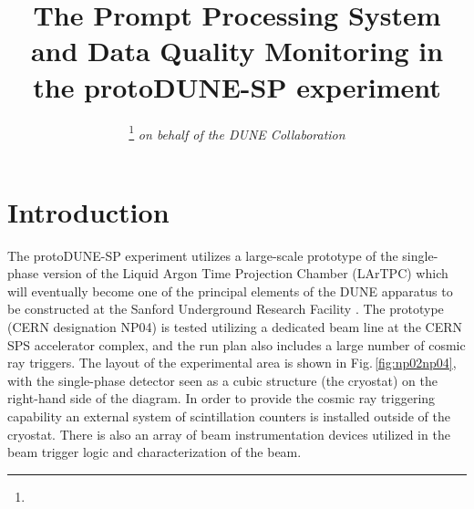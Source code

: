 \documentclass{webofc}
\newcommand{\pd}{protoDUNE\xspace}
\begin{document}
%
\title{The Prompt Processing System and Data Quality Monitoring in the \pd-SP experiment}
%
\author{ 
\fnsep\thanks{} \it{on behalf of the DUNE Collaboration}
}




%
\maketitle
%
\section{Introduction}
\label{sec:intro}
The \pd-SP experiment utilizes a large-scale prototype of the single-phase version of the
Liquid Argon Time Projection Chamber (LArTPC) which will eventually become one
of the principal elements of the DUNE apparatus to be constructed at the Sanford Underground
Research Facility \cite{cdrVol1, cdrVol4}. The prototype (CERN designation NP04) is tested
utilizing a dedicated beam line  at the CERN SPS accelerator complex,
and the run plan also includes a large number of cosmic ray triggers. The layout of the
experimental area is shown in Fig.\,\ref{fig:np02np04}, with the single-phase detector seen as
a cubic structure (the cryostat) on the right-hand side of the diagram. 
In order to provide
the cosmic ray triggering capability an external system of scintillation counters is installed
outside of the cryostat. There is also an array of beam instrumentation devices utilized
in the beam trigger logic and characterization of the beam.
\end{document}
